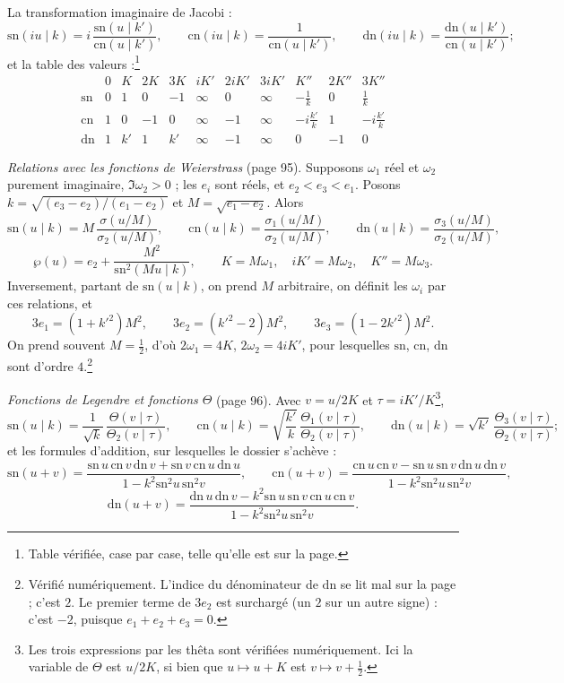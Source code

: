 \documentclass[11pt,a4paper]{article}
\begin{document}
La transformation imaginaire de Jacobi :
\[
\mathrm{sn}(iu \mid k) = i\,\frac{\mathrm{sn}(u \mid k')}{\mathrm{cn}(u \mid
k')}, \qquad \mathrm{cn}(iu \mid k) = \frac{1}{\mathrm{cn}(u \mid k')}, \qquad
\mathrm{dn}(iu \mid k) = \frac{\mathrm{dn}(u \mid k')}{\mathrm{cn}(u \mid k')} ;
\]
et la table des valeurs :\footnote{Table vérifiée, case par case, telle qu'elle est sur la page.}
\[
\begin{array}{c|cccccccccc}
 & 0 & K & 2K & 3K & iK' & 2iK' & 3iK' & K'' & 2K'' & 3K''\\
\hline
\mathrm{sn} & 0 & 1 & 0 & -1 & \infty & 0 & \infty & -\frac1k & 0 & \frac1k\\
\mathrm{cn} & 1 & 0 & -1 & 0 & \infty & -1 & \infty & -i\frac{k'}{k} & 1 & -i\frac{k'}{k}\\
\mathrm{dn} & 1 & k' & 1 & k' & \infty & -1 & \infty & 0 & -1 & 0
\end{array}
\]


\emph{Relations avec les fonctions de Weierstrass} (page 95). Supposons
$\omega_1$ réel et $\omega_2$ purement imaginaire, $\Im\omega_2 > 0$ ; les $e_i$
sont réels, et $e_2 < e_3 < e_1$. Posons $k = \sqrt{(e_3 - e_2)/(e_1 - e_2)}$ et
$M = \sqrt{e_1 - e_2}$. Alors
\[
\mathrm{sn}(u \mid k) = M\,\frac{\sigma(u/M)}{\sigma_2(u/M)}, \qquad
\mathrm{cn}(u \mid k) = \frac{\sigma_1(u/M)}{\sigma_2(u/M)}, \qquad
\mathrm{dn}(u \mid k) = \frac{\sigma_3(u/M)}{\sigma_2(u/M)},
\]
\[
\wp(u) = e_2 + \frac{M^2}{\mathrm{sn}^2(Mu \mid k)}, \qquad K = M\omega_1,\quad iK'
= M\omega_2,\quad K'' = M\omega_3 .
\]
Inversement, partant de $\mathrm{sn}(u \mid k)$, on prend $M$ arbitraire, on
définit les $\omega_i$ par ces relations, et
\[
3e_1 = (1 + k'^2)M^2, \qquad 3e_2 = (k'^2 - 2)M^2, \qquad 3e_3 = (1 -
2k'^2)M^2 .
\]
On prend souvent $M = \frac12$, d'où $2\omega_1 = 4K$, $2\omega_2 = 4iK'$, pour
lesquelles $\mathrm{sn}$, $\mathrm{cn}$, $\mathrm{dn}$ sont d'ordre
$4$.\footnote{Vérifié numériquement. L'indice du dénominateur de $\mathrm{dn}$
se lit mal sur la page ; c'est $2$. Le premier terme de $3e_2$ est surchargé (un
$2$ sur un autre signe) : c'est $-2$, puisque $e_1 + e_2 + e_3 = 0$.}

\emph{Fonctions de Legendre et fonctions $\Theta$} (page 96). Avec $v = u/2K$ et
$\tau = iK'/K$\footnote{Les trois expressions par les thêta sont vérifiées numériquement.
Ici la variable de $\Theta$ est $u/2K$, si bien que $u \mapsto u + K$ est $v
\mapsto v + \frac12$.},
\[
\mathrm{sn}(u \mid k) = \frac{1}{\sqrt k}\,\frac{\Theta(v \mid
\tau)}{\Theta_2(v \mid \tau)}, \qquad \mathrm{cn}(u \mid k) =
\sqrt{\frac{k'}{k}}\,\frac{\Theta_1(v \mid \tau)}{\Theta_2(v \mid \tau)},
\qquad \mathrm{dn}(u \mid k) = \sqrt{k'}\,\frac{\Theta_3(v \mid
\tau)}{\Theta_2(v \mid \tau)} ;
\]
et les formules d'addition, sur lesquelles le dossier s'achève :
\[
\mathrm{sn}(u+v) = \frac{\mathrm{sn}\,u\,\mathrm{cn}\,v\,\mathrm{dn}\,v +
\mathrm{sn}\,v\,\mathrm{cn}\,u\,\mathrm{dn}\,u}{1 -
k^2\mathrm{sn}^2u\,\mathrm{sn}^2v}, \qquad
\mathrm{cn}(u+v) = \frac{\mathrm{cn}\,u\,\mathrm{cn}\,v -
\mathrm{sn}\,u\,\mathrm{sn}\,v\,\mathrm{dn}\,u\,\mathrm{dn}\,v}{1 -
k^2\mathrm{sn}^2u\,\mathrm{sn}^2v},
\]
\[
\mathrm{dn}(u+v) = \frac{\mathrm{dn}\,u\,\mathrm{dn}\,v -
k^2\mathrm{sn}\,u\,\mathrm{sn}\,v\,\mathrm{cn}\,u\,\mathrm{cn}\,v}{1 -
k^2\mathrm{sn}^2u\,\mathrm{sn}^2v} .
\]
\end{document}
